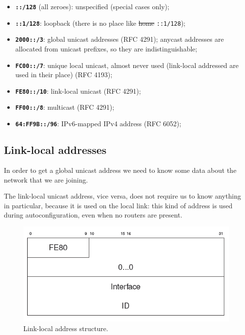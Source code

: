 \begin{itemize}
    \item \textbf{\texttt{::/128}} (all zeroes): unspecified (special cases only);
    \item \textbf{\texttt{::1/128}}: loopback (there is no place like \sout{home} \texttt{::1/128});
    \item \textbf{\texttt{2000::/3}}: global unicast addresses (RFC 4291); anycast addresses are allocated from unicast prefixes, so they are indistinguishable;
    \item \textbf{\texttt{FC00::/7}}: unique local unicast, almost never used (link-local addressed are used in their place) (RFC 4193);
    \item \textbf{\texttt{FE80::/10}}: link-local unicast (RFC 4291);
    \item \textbf{\texttt{FF00::/8}}: multicast (RFC 4291);
    \item \textbf{\texttt{64:FF9B::/96}}: IPv6-mapped IPv4 address (RFC 6052);
\end{itemize}


\subsection{Link-local addresses}
In order to get a global unicast address we need to know some data about the network that we are joining.

The link-local unicast address, vice versa, does not require us to know anything in particular, because it is used on the local link: this kind of address is used during autoconfiguration, even when no routers are present.

\begin{figure}[h]
    \centering
    \includegraphics[scale=1]{img/ll.png}
    \decoRule
    \caption{Link-local address structure.}
    \label{fig:ll}
\end{figure}

